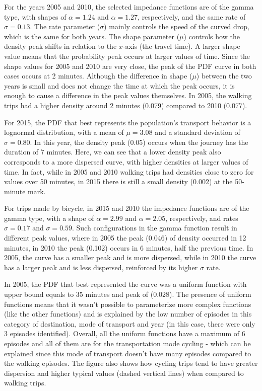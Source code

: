 \documentclass[preprint, 3p,
authoryear]{elsarticle} %
\begin{document}
For the years 2005 and 2010, the selected impedance functions are of the
gamma type, with shapes of \(\alpha = 1.24\) and \(\alpha = 1.27\),
respectively, and the same rate of \(\sigma = 0.13\). The rate parameter
(\(\sigma\)) mainly controls the speed of the curved drop, which is the
same for both years. The shape parameter (\(\mu\)) controls how the
density peak shifts in relation to the \(x\)-axis (the travel time). A
larger shape value means that the probability peak occurs at larger
values of time. Since the shape values for 2005 and 2010 are very close,
the peak of the PDF curve in both cases occurs at 2 minutes. Although
the difference in shape (\(\mu\)) between the two years is small and
does not change the time at which the peak occurs, it is enough to cause
a difference in the peak values themselves. In 2005, the walking trips
had a higher density around 2 minutes (0.079) compared to 2010 (0.077).

For 2015, the PDF that best represents the population's transport
behavior is a lognormal distribution, with a mean of \(\mu = 3.08\) and
a standard deviation of \(\sigma = 0.80\). In this year, the density
peak (0.05) occurs when the journey has the duration of 7 minutes. Here,
we can see that a lower density peak also corresponds to a more
dispersed curve, with higher densities at larger values of time. In
fact, while in 2005 and 2010 walking trips had densities close to zero
for values over 50 minutes, in 2015 there is still a small density
(0.002) at the 50-minute mark.

For trips made by bicycle, in 2015 and 2010 the impedance functions are
of the gamma type, with a shape of \(\alpha = 2.99\) and
\(\alpha = 2.05\), respectively, and rates \(\sigma = 0.17\) and
\(\sigma = 0.59\). Such configurations in the gamma function result in
different peak values, where in 2005 the peak (0.046) of density
occurred in 12 minutes, in 2010 the peak (0.102) occurs in 6 minutes,
half the previous time. In 2005, the curve has a smaller peak and is
more dispersed, while in 2010 the curve has a larger peak and is less
dispersed, reinforced by its higher \(\sigma\) rate.

In 2005, the PDF that best represented the curve was a uniform function
with upper bound equals to 35 minutes and peak of (0.028). The presence
of uniform functions means that it wasn't possible to parameterize more
complex functions (like the other functions) and is explained by the low
number of episodes in this category of destination, mode of transport
and year (in this case, there were only 3 episodes identified). Overall,
all the uniform functions have a maximum of 6 episodes and all of them
are for the transportation mode cycling - which can be explained since
this mode of transport doesn't have many episodes compared to the
walking episodes. The figure also shows how cycling trips tend to have
greater dispersion and higher typical values (dashed vertical lines)
when compared to walking trips.
\end{document}
